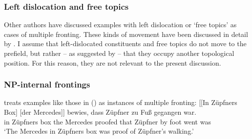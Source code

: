 




\subsubsection{Left dislocation and free topics}
\label{sec-left-dislocation-hanging-topic}
              
Other authors have discussed examples with left dislocation or `free topics' as cases of multiple
fronting. These kinds of movement
have been discussed in detail by \citet{Altmann81}. I assume that left-dislocated constituents and free topics do not move to the
prefield, but rather -- as suggested by \citet[]{Hoehle86} -- that they occupy another topological position. For this reason,
they are not relevant to the present discussion.

\subsubsection{NP-internal frontings}
\label{sec-np-internal-frontings}


\citet[]{Speyer2008a} treats examples like those in () as instances of multiple fronting:
\ea
\label{ex-inzuepfners-box-der-mercedes}
\gll {}[[In Züpfners Box] [der Mercedes]] bewies, dass Züpfner zu Fuß gegangen war.\footnotemark\\
       \hspaceThis{[[}in Züpfners box \spacebr{}the Mercedes proofed that Züpfner by foot went was\\
\glt `The Mercedes in Züpfners box was proof of Züpfner's walking.'
\z

